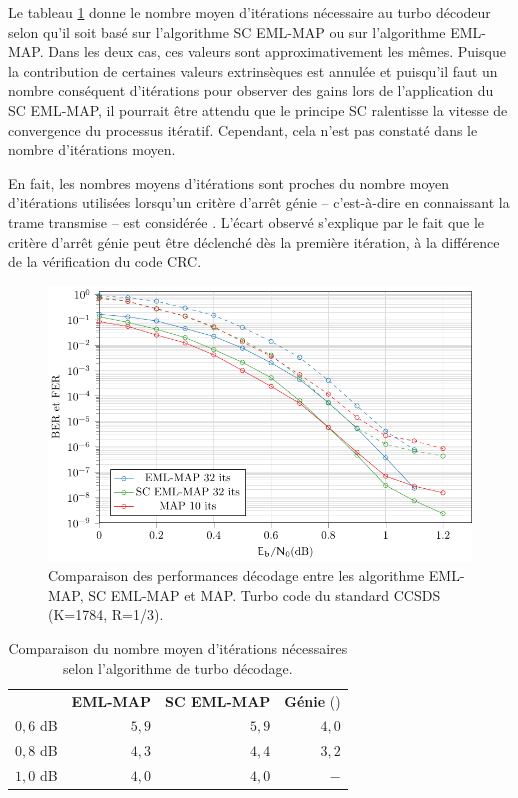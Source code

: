 Le tableau \ref{tab:itmoy} donne le nombre moyen d'itérations nécessaire au turbo décodeur selon qu'il soit basé sur 
l'algorithme SC EML-MAP ou sur l'algorithme EML-MAP. Dans les deux cas, ces valeurs sont approximativement les mêmes. 
Puisque la contribution de certaines valeurs extrinsèques est annulée et puisqu'il faut un nombre conséquent d'itérations 
pour observer des gains lors de l'application du SC EML-MAP, il pourrait être attendu que le principe SC ralentisse la vitesse 
de convergence du processus itératif. Cependant, cela n'est pas constaté dans le nombre d'itérations moyen.

En fait, les nombres moyens d'itérations sont proches du nombre moyen d'itérations utilisées lorsqu'un critère d'arrêt 
génie -- c'est-à-dire en connaissant la trame transmise -- est considérée \cite{matache2000stopping}. L'écart observé 
s'explique par le fait que le critère d'arrêt génie peut être déclenché dès la première itération, à la différence de
la vérification du code CRC.

\begin{figure}[tb]
	\centering
	\includegraphics[width=.9\textwidth]{main/ch2_fig/tikz/ccsds_sc.pdf}
	\caption{\label{fig:ccsds_sc}Comparaison des performances décodage entre les algorithme EML-MAP, SC EML-MAP et MAP. Turbo code du standard CCSDS (K=1784, R=1/3).}
\end{figure}

\begin{table}[tb]
	\centering
	\renewcommand{\arraystretch}{.9}
	\begin{tabular}{lrrr}
		\toprule
		    & \textbf{EML-MAP} & \textbf{SC EML-MAP} & \textbf{Génie} (\cite{matache2000stopping})\\ 
		 \cmidrule(l){2-2} \cmidrule(l){3-3} \cmidrule(l){4-4} 
		$0,6$ dB & $5,9$ & $5,9$ & $4,0$\\
		$0,8$ dB & $4,3$ & $4,4$ & $3,2$\\
		$1,0$ dB & $4,0$ & $4,0$ & $-$\\
		\bottomrule
	\end{tabular}
	\caption{Comparaison du nombre moyen d’itérations nécessaires selon l'algorithme de turbo décodage.}
	\label{tab:itmoy}
\end{table}

